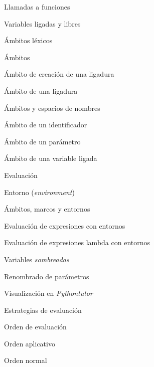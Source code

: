 \begin{longenum}
\begin{longenum}
\begin{longenum}
\begin{longenum}
                \item Llamadas a funciones
            \end{longenum}
            \item Variables ligadas y libres
        \end{longenum}
        \item Ámbitos léxicos
        \begin{longenum}
            \item Ámbitos
            \item Ámbito de creación de una ligadura
            \item Ámbito de una ligadura
            \item Ámbitos y espacios de nombres
            \item Ámbito de un identificador
            \item Ámbito de un parámetro
            \item Ámbito de una variable ligada
        \end{longenum}
        \item Evaluación
        \begin{longenum}
            \item Entorno (\textit{environment})
            \begin{longenum}
                \item Ámbitos, marcos y entornos
            \end{longenum}
            \item Evaluación de expresiones con entornos
            \item Evaluación de expresiones lambda con entornos
            \begin{longenum}
                \item Variables \textit{sombreadas}
                \item Renombrado de parámetros
                \item Visualización en \textit{Pythontutor}
            \end{longenum}
            \item Estrategias de evaluación 
            \begin{longenum}
                \item Orden de evaluación
                \begin{longenum}
                    \item Orden aplicativo
                    \item Orden normal

\end{longenum}
\end{longenum}
\end{longenum}
\end{longenum}
\end{longenum}

